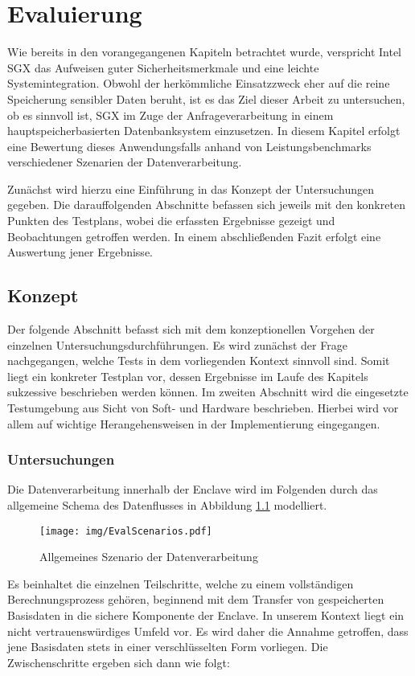 
\chapter{Evaluierung}

Wie bereits in den vorangegangenen Kapiteln betrachtet wurde, verspricht Intel \ac{SGX} das Aufweisen guter Sicherheitsmerkmale und eine leichte Systemintegration. Obwohl der herkömmliche Einsatzzweck eher auf die reine Speicherung sensibler Daten beruht, ist es das Ziel dieser Arbeit zu untersuchen, ob es sinnvoll ist, \ac{SGX} im Zuge der Anfrageverarbeitung in einem hauptspeicherbasierten Datenbanksystem einzusetzen. In diesem Kapitel erfolgt eine Bewertung dieses Anwendungsfalls anhand von Leistungsbenchmarks verschiedener Szenarien der Datenverarbeitung.

Zunächst wird hierzu eine Einführung in das Konzept der Untersuchungen gegeben. Die darauffolgenden Abschnitte befassen sich jeweils mit den konkreten Punkten des Testplans, wobei die erfassten Ergebnisse gezeigt und Beobachtungen getroffen werden. In einem abschließenden Fazit erfolgt eine Auswertung jener Ergebnisse.

\section{Konzept}

Der folgende Abschnitt befasst sich mit dem konzeptionellen Vorgehen der einzelnen Untersuchungsdurchführungen. Es wird zunächst der Frage nachgegangen, welche Tests in dem vorliegenden Kontext sinnvoll sind. Somit liegt ein konkreter Testplan vor, dessen Ergebnisse im Laufe des Kapitels sukzessive beschrieben werden können. Im zweiten Abschnitt wird die eingesetzte Testumgebung aus Sicht von Soft- und Hardware beschrieben. Hierbei wird vor allem auf wichtige Herangehensweisen in der Implementierung eingegangen.

\subsection{Untersuchungen}

Die Datenverarbeitung innerhalb der Enclave wird im Folgenden durch das allgemeine Schema des Datenflusses in Abbildung \ref{fig:scenarios} modelliert.
\begin{figure}[h]
	\texttt{[image: img/EvalScenarios.pdf]}
	\centering
	\caption{Allgemeines Szenario der Datenverarbeitung}
	\label{fig:scenarios}
\end{figure} 
Es beinhaltet die einzelnen Teilschritte, welche zu einem vollständigen Berechnungsprozess gehören, beginnend mit dem Transfer von gespeicherten Basisdaten in die sichere Komponente der Enclave. In unserem Kontext liegt ein nicht vertrauenswürdiges Umfeld vor. Es wird daher die Annahme getroffen, dass jene Basisdaten stets in einer verschlüsselten Form vorliegen. Die Zwischenschritte ergeben sich dann wie folgt:

